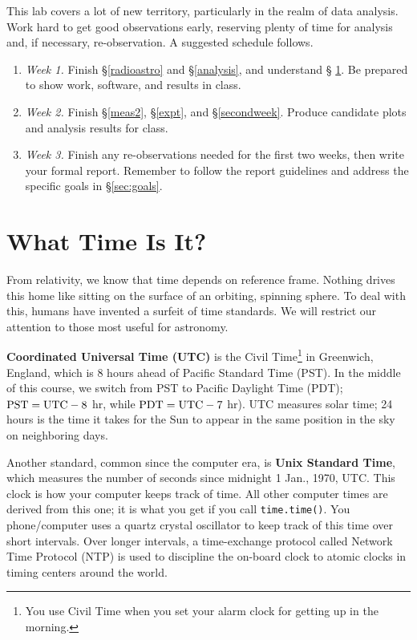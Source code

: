 \documentclass[11pt,preprint]{aastex}
\begin{document}
\noindent
This lab covers a lot of new territory, particularly in the realm of data
analysis. Work hard to get good observations early, reserving plenty of
time for analysis and, if necessary, re-observation. A suggested schedule
follows.
\begin{enumerate}

\item {\it Week 1.}
Finish \S\ref{radioastro} and \S \ref{analysis}, and understand \S
  \ref{jultime}. Be prepared to show work, software, and results in class.

\item {\it Week 2.}
Finish \S \ref{meas2}, \S \ref{expt}, and \S \ref{secondweek}. Produce
candidate plots and analysis results for class.

\item {\it Week 3.} Finish any re-observations needed for the first
two weeks, then write your formal
  report. Remember to follow the report guidelines and address the specific
goals in \S\ref{sec:goals}.

\end{enumerate}


\section{What Time Is It?} \label{jultime}

\noindent
From relativity, we know that time depends on
reference frame. Nothing drives this home like sitting on the surface
of an orbiting, spinning sphere.
To deal with this, humans have invented a surfeit of time standards.
We will restrict our attention to those most useful for astronomy.

{\bf Coordinated Universal Time (UTC)} is the Civil Time\footnote{You use
  Civil Time when you set your alarm clock for getting up in the
  morning.} in Greenwich, England, which is 8 hours ahead of 
Pacific Standard Time (PST). In the middle of this course, we switch from
PST to Pacific Daylight Time (PDT); 
${\rm PST}={\rm UTC} - 8$ hr, while ${\rm PDT}={\rm UTC} - 7$ hr). UTC measures
solar time; 24 hours is the time it takes for the Sun to appear
in the same position in the sky on neighboring days.

Another standard, common since the computer era, is {\bf Unix Standard Time}, which measures the
number of seconds since midnight 1 Jan., 1970, UTC. 
This clock is how your computer keeps track of time. All other computer times
are derived from this one; it
is what you get if you call {\tt time.time()}.
You phone/computer uses a quartz crystal oscillator to keep track of 
this time over short intervals.  Over longer intervals, a time-exchange protocol called 
Network Time Protocol (NTP) is used to discipline the on-board clock to 
atomic clocks in timing centers around the world.
\end{document}
